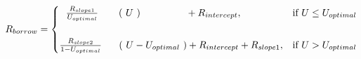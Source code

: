 \documentclass[preview]{standalone}
\begin{document}
\begin{align*}
R_{borrow} =\begin{cases} \ \ \frac{R_{slope1}}{U_{optimal}}\ \ \hspace{0.5cm} (\ U \ )\ \ \ \ \ \ \ \ \ \ \ \ \ \  + R_{intercept}, & \text{if } U \leq U_{optimal} \\\\[0.3em] \frac{R_{slope2}}{1-U_{optimal}}\ \hspace{0.5cm} (\ U-U_{optimal}\ ) + R_{intercept} + R_{slope1}, & \text{if } U > U_{optimal} \end{cases}
\end{align*}
\end{document}
